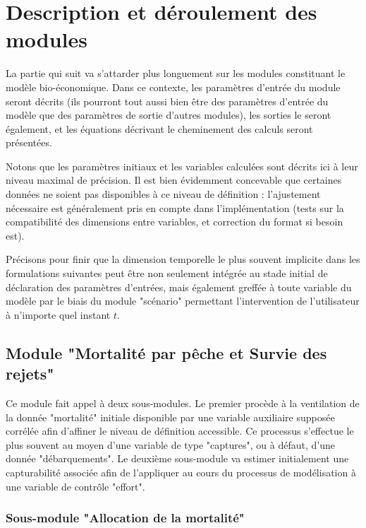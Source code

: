 \documentclass[12pt, colorinlistoftodos]{article}
\begin{document}
\section{Description et déroulement des modules}

La partie qui suit va s'attarder plus longuement sur les modules constituant le modèle bio-économique. 
Dans ce contexte, les paramètres d'entrée du module seront décrits (ils pourront tout aussi bien être 
des paramètres d'entrée du modèle que des paramètres de sortie d'autres modules), les sorties le seront également, 
et les équations décrivant le cheminement des calculs seront présentées. 

Notons que les paramètres initiaux et les variables calculées sont décrits ici à leur niveau maximal de précision. 
Il est bien évidemment concevable que certaines données ne soient pas disponibles à ce niveau de définition : 
l’ajustement nécessaire est généralement pris en compte dans l’implémentation (tests sur la compatibilité des 
dimensions entre variables, et correction du format si besoin est).

Précisons pour finir que  la dimension temporelle le plus souvent implicite dans les formulations suivantes 
peut être non seulement intégrée au stade initial de déclaration des paramètres d’entrées, mais également 
greffée à toute variable du modèle par le biais du module "scénario" permettant l'intervention de l'utilisateur 
à n'importe quel instant $t$.


\subsection{Module "Mortalité par pêche et Survie des rejets"}

Ce module fait appel à deux sous-modules. Le premier procède à la ventilation de la donnée "mortalité" initiale 
disponible par une variable auxiliaire supposée corrélée afin d’affiner le niveau de définition accessible. 
Ce processus s’effectue le plus souvent au moyen d’une variable de type "captures", ou à défaut, 
d’une donnée "débarquements". Le deuxième sous-module va estimer initialement une capturabilité 
associée afin de l’appliquer au cours du processus de modélisation à une variable de contrôle "effort". 

\subsubsection{Sous-module "Allocation de la mortalité"}
\end{document}
